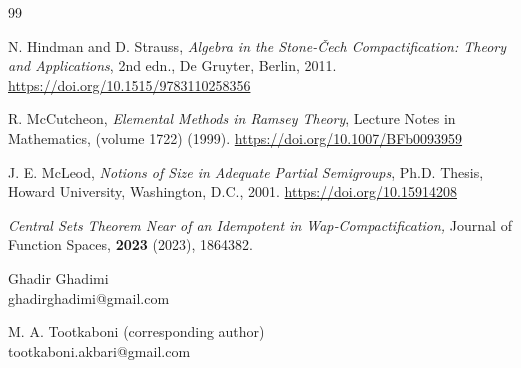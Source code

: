 \documentclass[twoside,11pt]{article}
\begin{document}
\begin{thebibliography}{99}
	
	
	N. Hindman and D. Strauss,
	\textit{Algebra in the Stone-{\v C}ech Compactification: Theory and Applications},
	2nd edn., De Gruyter, Berlin, 2011.
	\url{https://doi.org/10.1515/9783110258356}
	
	R. McCutcheon,
	\textit{Elemental Methods in Ramsey Theory},
	Lecture Notes in Mathematics, (volume 1722) (1999).
	\url{https://doi.org/10.1007/BFb0093959}
	
	
	J. E. McLeod,
	\textit{Notions of Size in Adequate Partial Semigroups},
	Ph.D. Thesis, Howard University, Washington, D.C., 2001.
	\url{https://doi.org/10.15914208}
	
	 {\it Central Sets Theorem Near of an Idempotent in Wap‐Compactification,} {Journal of Function Spaces, }{\bf 2023} {(2023)}, 1864382.
	
\end{thebibliography}



\noindent Ghadir Ghadimi\\  %
ghadirghadimi@gmail.com\\
\bigskip

\noindent M. A. Tootkaboni (corresponding author)\\
tootkaboni.akbari@gmail.com\\
{}\bigskip
\end{document}
